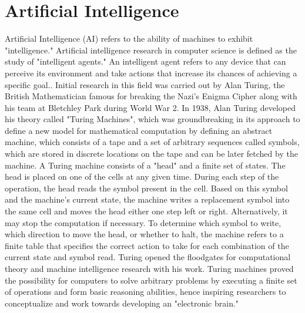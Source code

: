 \section{Artificial Intelligence}
Artificial Intelligence (AI) refers to the ability of machines to exhibit "intelligence." Artificial intelligence research in computer science is defined as the study of "intelligent agents." An intelligent agent refers to any device that can perceive its environment and take actions that increase its chances of achieving a specific goal.\cite{russell2010artificial}. Initial research in this field was carried out by Alan Turing, the British Mathematician famous for breaking the Nazi's Enigma Cipher along with his team at Bletchley Park during World War 2. In 1938, Alan Turing developed his theory called "Turing Machines"\cite{Hodges+2015}, which was groundbreaking in its approach to define a new model for mathematical computation by defining an abstract machine, which consists of a tape and a set of arbitrary sequences called symbols, which are stored in discrete locations on the tape and can be later fetched by the machine. A Turing machine consists of a "head" and a finite set of states. The head is placed on one of the cells at any given time. During each step of the operation, the head reads the symbol present in the cell. Based on this symbol and the machine's current state, the machine writes a replacement symbol into the same cell and moves the head either one step left or right. Alternatively, it may stop the computation if necessary. To determine which symbol to write, which direction to move the head, or whether to halt, the machine refers to a finite table that specifies the correct action to take for each combination of the current state and symbol read. Turing opened the floodgates for computational theory and machine intelligence research with his work\cite{de2018turing}. Turing machines proved the possibility for computers to solve arbitrary problems by executing a finite set of operations and form basic reasoning abilities, hence inspiring researchers to conceptualize and work towards developing an "electronic brain." \\

